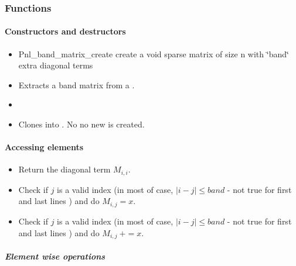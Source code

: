 \subsubsection{Functions}
\paragraph{Constructors and destructors}
\begin{itemize}
\item 
  \sshortdescribe Pnl_band_matrix_create create a void sparse matrix of size n with
  \char`\"{}band\char`\"{} extra diagonal terms
\item
  \sshortdescribe Extracts a band matrix from a .
\item
\item {}
  \sshortdescribe Clones  into . No no new
   is created.
\end{itemize}
\paragraph{Accessing elements}
\begin{itemize}
\item 
  \sshortdescribe Return the diagonal term $M_{i, i}$.
\item 
  \sshortdescribe Check if $j$ is a valid index (in most of case, $|i-j|\leq
  band $ - not true for first and last lines )
  and do $M_{i, j}=x$.
\item 
  \sshortdescribe Check if $j$ is a valid index (in most of case, $|i-j|\leq
  band $ - not true for first and last lines )
  and do $M_{i, j} \ +=x$.
\end{itemize}

\subparagraph{Element wise operations}

